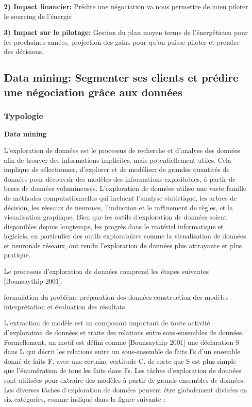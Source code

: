 \documentclass[12pt]{article}
\begin{document}
{\textbf{2) Impact financier: }
Prédire une négociation va nous permettre de mieu piloter le sourcing de l'énergie

\textbf{3) Impact sur le pilotage:}
Gestion du plan moyen terme de l'énergéticien pour les prochaines années, projection des gains pour qu'on puisse piloter et prendre des décisions. 

\subsection{Data mining: Segmenter ses clients et prédire une négociation grâce aux données}
\subsubsection{Typologie}

\textbf{Data mining}

L'exploration de données est le processus de recherche et d'analyse des données afin de trouver des informations implicites, mais potentiellement utiles. Cela implique de sélectionner, d'explorer et de modéliser de grandes quantités de données pour découvrir des modèles des informations exploitables, à partir de bases de données volumineuses.
L'exploration de données utilise une vaste famille de méthodes computationnelles qui incluent l'analyse statistique, les arbres de décision, les réseaux de neurones, l'induction et le raffinement de règles, et la visualisation graphique.
Bien que les outils d'exploration de données soient disponibles depuis longtemps, les progrès dans le matériel informatique et logiciels, en particulier des outils exploratoires comme la visualisation de données et neuronale réseaux, ont rendu l'exploration de données plus attrayante et plus pratique. 

Le processus d'exploration de données comprend les étapes suivantes {\color{red}[Bounsaythip 2001]}:
\begin{outline}
\1 formulation du problème
\1 préparation des données
\1 construction des modèles
\1 interprétation et évaluation des résultats
\end{outline}

L'extraction de modèle est un composant important de toute activité d'exploration de données et traite des relations entre sous-ensembles de données. Formellement, un motif est défini
comme {\color{red}[Bounsaythip 2001]} une déclaration S dans L qui décrit les relations entre un sous-ensemble de faits Fs d'un ensemble donné de faits F, avec une certaine certitude C, de sorte que S est plus simple que l’énumération de tous les faits dans Fs.
Les tâches d'exploration de données sont utilisées pour extraire des modèles à partir de grands ensembles de données. Les diverses tâches d'exploration de données peuvent être globalement divisées en six catégories, comme indiqué dans la figure suivante :


}
\end{document}
